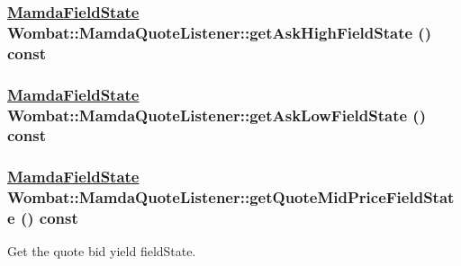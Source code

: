 \hypertarget{classWombat_1_1MamdaQuoteListener_eeafa59d487408997b68812a8c6686e2}{
\subsubsection[getAskHighFieldState]{\setlength{\rightskip}{0pt plus 5cm}\hyperlink{namespaceWombat_93aac974f2ab713554fd12a1fa3b7d2a}{Mamda\-Field\-State} Wombat::Mamda\-Quote\-Listener::get\-Ask\-High\-Field\-State () const}}
\label{classWombat_1_1MamdaQuoteListener_eeafa59d487408997b68812a8c6686e2}


\hypertarget{classWombat_1_1MamdaQuoteListener_eaf6f8cbb1ca477e3d4ffedb4753e105}{
\subsubsection[getAskLowFieldState]{\setlength{\rightskip}{0pt plus 5cm}\hyperlink{namespaceWombat_93aac974f2ab713554fd12a1fa3b7d2a}{Mamda\-Field\-State} Wombat::Mamda\-Quote\-Listener::get\-Ask\-Low\-Field\-State () const}}
\label{classWombat_1_1MamdaQuoteListener_eaf6f8cbb1ca477e3d4ffedb4753e105}


\hypertarget{classWombat_1_1MamdaQuoteListener_19d19b0f64db3586e14b88f4a502ecbf}{
\subsubsection[getQuoteMidPriceFieldState]{\setlength{\rightskip}{0pt plus 5cm}\hyperlink{namespaceWombat_93aac974f2ab713554fd12a1fa3b7d2a}{Mamda\-Field\-State} Wombat::Mamda\-Quote\-Listener::get\-Quote\-Mid\-Price\-Field\-State () const}}
\label{classWombat_1_1MamdaQuoteListener_19d19b0f64db3586e14b88f4a502ecbf}


Get the quote bid yield field\-State. 

